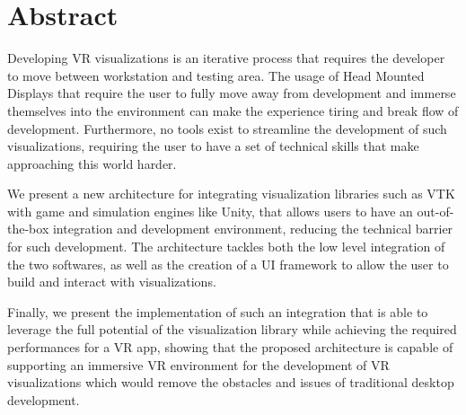 \chapter*{Abstract}

Developing VR visualizations is an iterative process that requires the developer to move between workstation and testing area. The usage of Head Mounted Displays that require the user to fully move away from development and immerse themselves into the environment can make the experience tiring and break flow of development. Furthermore, no tools exist to streamline the development of such visualizations, requiring the user to have a set of technical skills that make approaching this world harder.

We present a new architecture for integrating visualization libraries such as VTK with game and simulation engines like Unity, that allows users to have an out-of-the-box integration and development environment, reducing the technical barrier for such development. The architecture tackles both the low level integration of the two softwares, as well as the creation of a UI framework to allow the user to build and interact with visualizations.

Finally, we present the implementation of such an integration that is able to leverage the full potential of the visualization library while achieving the required performances for a VR app, showing that the proposed architecture is capable of supporting an immersive VR environment for the development of VR visualizations which would remove the obstacles and issues of traditional desktop development.
